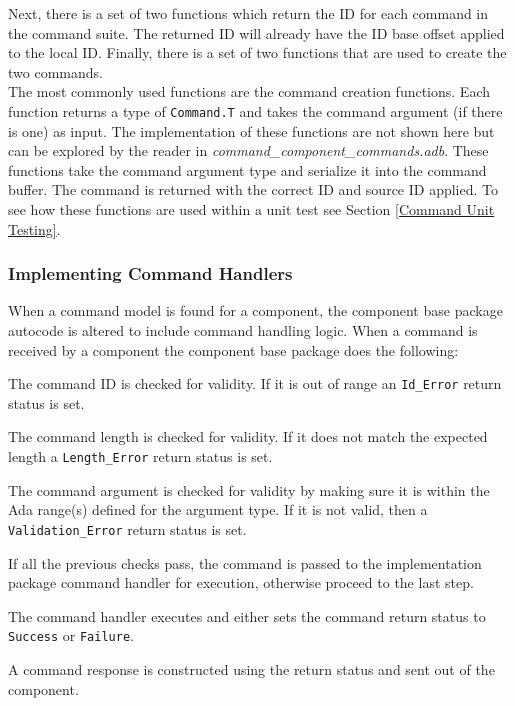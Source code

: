 Next, there is a set of two functions which return the ID for each command in the command suite. The returned ID will already have the ID base offset applied to the local ID. Finally, there is a set of two functions that are used to create the two commands. \\

The most commonly used functions are the command creation functions. Each function returns a type of \texttt{Command.T} and takes the command argument (if there is one) as input. The implementation of these functions are not shown here but can be explored by the reader in \textit{command\_component\_commands.adb}. These functions take the command argument type and serialize it into the command buffer. The command is returned with the correct ID and source ID applied. To see how these functions are used within a unit test see Section \ref{Command Unit Testing}.

\subsubsection{Implementing Command Handlers}

When a command model is found for a component, the component base package autocode is altered to include command handling logic. When a command is received by a component the component base package does the following:

\vspace{5mm} %
\begin{spacedenumerate}
  \item The command ID is checked for validity. If it is out of range an \texttt{Id\_Error} return status is set.
  \item The command length is checked for validity. If it does not match the expected length a \texttt{Length\_Error} return status is set.
  \item The command argument is checked for validity by making sure it is within the Ada range(s) defined for the argument type. If it is not valid, then a \texttt{Validation\_Error} return status is set.
  \item If all the previous checks pass, the command is passed to the implementation package command handler for execution, otherwise proceed to the last step.
  \item The command handler executes and either sets the command return status to \texttt{Success} or \texttt{Failure}.
  \item A command response is constructed using the return status and sent out of the component.
\end{spacedenumerate}
\vspace{5mm} %

